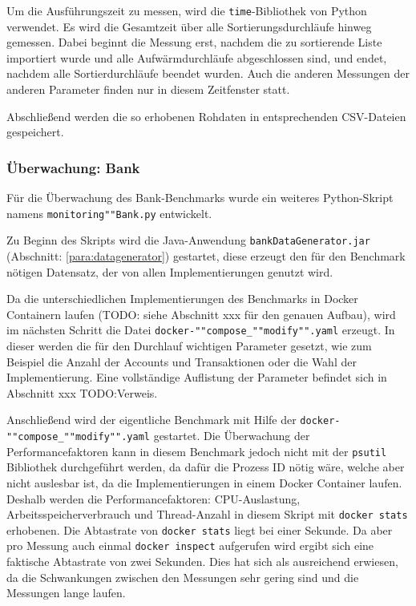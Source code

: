 \documentclass[fontsize=12pt,paper=a4,twoside=semi,parskip=half-,headsepline,headinclude]{scrreprt}
\begin{document}
Um die Ausführungszeit zu messen, wird die \texttt{time}-Bibliothek von Python verwendet. Es wird die Gesamtzeit über alle Sortierungsdurchläufe hinweg gemessen. Dabei beginnt die Messung erst, nachdem die zu sortierende Liste importiert wurde und alle Aufwärmdurchläufe abgeschlossen sind, und endet, nachdem alle Sortierdurchläufe beendet wurden. Auch die anderen Messungen der anderen Parameter finden nur in diesem Zeitfenster statt. 

Abschließend werden die so erhobenen Rohdaten in entsprechenden CSV-Dateien gespeichert.

\subsubsection{Überwachung: Bank}
\label{subsubsec:monibank}

Für die Überwachung des Bank-Benchmarks wurde ein weiteres Python-Skript namens \texttt{monitoring""Bank.py} entwickelt.

Zu Beginn des Skripts wird die Java-Anwendung \texttt{bankDataGenerator.jar} (Abschnitt: \ref{para:datagenerator}) gestartet, diese erzeugt den für den Benchmark nötigen Datensatz, der von allen Implementierungen genutzt wird. 

Da die unterschiedlichen Implementierungen des Benchmarks in Docker Containern laufen (TODO: siehe Abschnitt xxx für den genauen Aufbau), wird im nächsten Schritt die Datei \texttt{docker-""compose\_""modify"".yaml} erzeugt. In dieser werden die für den Durchlauf wichtigen Parameter gesetzt, wie zum Beispiel die Anzahl der Accounts und Transaktionen oder die Wahl der Implementierung. Eine vollständige Auflistung der Parameter befindet sich in Abschnitt xxx TODO:Verweis.

Anschließend wird der eigentliche Benchmark mit Hilfe der \texttt{docker-""compose\_""modify"".yaml} gestartet. Die Überwachung der Performancefaktoren kann in diesem Benchmark jedoch nicht mit der \texttt{psutil} Bibliothek durchgeführt werden, da dafür die Prozess ID nötig wäre, welche aber nicht auslesbar ist, da die Implementierungen in einem Docker Container laufen. Deshalb werden die Performancefaktoren: CPU-Auslastung, Arbeitsspeicherverbrauch und Thread-Anzahl in diesem Skript mit \texttt{docker stats} erhobenen. Die Abtastrate von \texttt{docker stats} liegt bei einer Sekunde. Da aber pro Messung auch einmal \texttt{docker inspect} aufgerufen wird ergibt sich eine faktische Abtastrate von zwei Sekunden. Dies hat sich als ausreichend erwiesen, da die Schwankungen zwischen den Messungen sehr gering sind und die Messungen lange laufen. 
\end{document}
